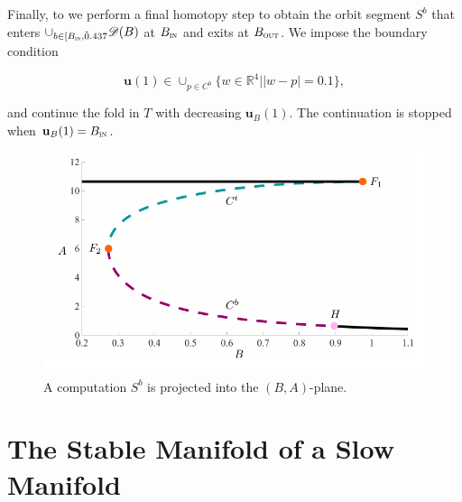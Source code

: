 \documentclass{ws-ijbc}
\begin{document}
Finally, to we perform a final homotopy step to obtain the orbit segment $S^b$ that enters $\cup_{b\in[B_{\textsc{in}}, \tilde 0.437} \mathscr{D}(B)$ at $B_{\textsc{in}}$ and exits at $B_{\textsc{out}}$.  We impose the boundary condition

\begin{equation}
\mathbf{u}(1) \in \cup_{p \in C^b}\{w \in \mathbb{R}^4 | |w-p| = 0.1\},
\label{BC_unstable7}
\end{equation}

\noindent
and continue the fold in $T$ with decreasing $\mathbf{u}_B(1)$.  The continuation is stopped when $\mathbf{u}_B(1) = B_{\textsc{in}}$.

\begin{figure}[!t]
\begin{center}
\includegraphics[page=14, width=\textwidth]{figures.pdf}
\end{center}
\caption{A computation $S^b$ is projected into the $(B,A)$-plane.}
\label{tube_figure}
\end{figure}


\section{The Stable Manifold of a Slow Manifold}
\end{document}
